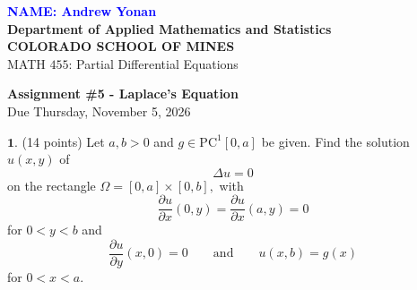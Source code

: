 \documentclass[12pt]{article}
\begin{document}
\begin{flushleft}

\textcolor{blue}{\textbf{NAME: Andrew Yonan}}\\
\textbf{Department of Applied Mathematics and Statistics}\\
\textbf{COLORADO SCHOOL OF MINES}\\


MATH $455$: Partial Differential Equations
\end{flushleft}

\vspace{0.1in}

\begin{center}
{\bf Assignment \#5 - Laplace's Equation} \\
Due Thursday, November 5, 2026 \\
\end{center}

\vspace{0.3in}

\noindent $\textbf{1}$. (14 points) Let $a,b > 0$ and $g \in \mathrm{PC}^1[0,a]$ be given. Find the solution $u(x,y)$ of 
$$\Delta u = 0$$
on the rectangle $ \Omega = [0,a] \times [0,b],$
with
$$\frac{\partial u}{\partial x}(0,y) = \frac{\partial u}{\partial x} (a,y) = 0$$
for $0 < y < b$ and
$$\frac{\partial u}{\partial y}(x,0) = 0 \qquad \mathrm{and} \qquad u(x,b) = g(x)$$
for $0 < x < a$.
\end{document}
